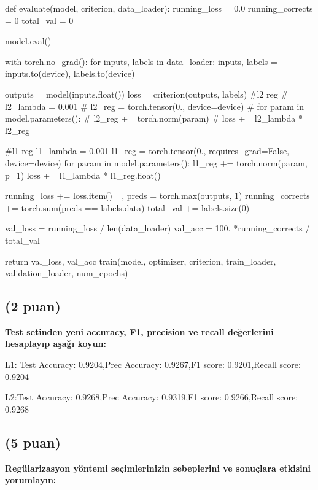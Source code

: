 \documentclass[11pt]{article}
\begin{document}
\begin{python}
def evaluate(model, criterion, data_loader):
    running_loss = 0.0
    running_corrects = 0
    total_val = 0

    model.eval() 

    with torch.no_grad(): 
        for inputs, labels in data_loader:
            inputs, labels = inputs.to(device), labels.to(device)

            outputs = model(inputs.float())
            loss = criterion(outputs, labels)
            #l2 reg
            # l2_lambda = 0.001
            # l2_reg = torch.tensor(0., device=device)
            # for param in model.parameters():
            #   l2_reg += torch.norm(param)
            # loss += l2_lambda * l2_reg
            
            #l1 reg
            l1_lambda = 0.001
            l1_reg = torch.tensor(0., requires_grad=False, device=device) 
            for param in model.parameters():
                l1_reg += torch.norm(param, p=1)
            loss += l1_lambda * l1_reg.float() 
            
            running_loss += loss.item()
            _, preds = torch.max(outputs, 1)
            running_corrects += torch.sum(preds == labels.data)
            total_val += labels.size(0)

    val_loss = running_loss / len(data_loader)
    val_acc = 100. *running_corrects / total_val

    return val_loss, val_acc
train(model, optimizer, criterion, train_loader, validation_loader, num_epochs)

\end{python}

\subsection{(2 puan)} \textbf{Test setinden yeni accuracy, F1, precision ve recall değerlerini hesaplayıp aşağı koyun:}

\newline L1:
Test Accuracy: 0.9204,Prec Accuracy: 0.9267,F1 score: 0.9201,Recall score: 0.9204\newline 

L2:Test Accuracy: 0.9268,Prec Accuracy: 0.9319,F1 score: 0.9266,Recall score: 0.9268\newline 
\newpage

\subsection{(5 puan)} \textbf{Regülarizasyon yöntemi seçimlerinizin sebeplerini ve sonuçlara etkisini yorumlayın:}
\end{document}
